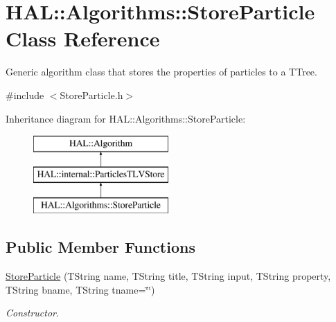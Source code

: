 \hypertarget{class_h_a_l_1_1_algorithms_1_1_store_particle}{\section{H\+A\+L\+:\+:Algorithms\+:\+:Store\+Particle Class Reference}
\label{class_h_a_l_1_1_algorithms_1_1_store_particle}
}


Generic algorithm class that stores the properties of particles to a T\+Tree.  




{\ttfamily \#include $<$Store\+Particle.\+h$>$}

Inheritance diagram for H\+A\+L\+:\+:Algorithms\+:\+:Store\+Particle\+:\begin{figure}[H]
\begin{center}
\leavevmode
\includegraphics[height=3.000000cm]{class_h_a_l_1_1_algorithms_1_1_store_particle}
\end{center}
\end{figure}
\subsection*{Public Member Functions}
\begin{DoxyCompactItemize}
\item 
\hyperlink{class_h_a_l_1_1_algorithms_1_1_store_particle_a160a46b43875d8968e865fc2335380f3}{Store\+Particle} (T\+String name, T\+String title, T\+String input, T\+String property, T\+String bname, T\+String tname=\char`\"{}\char`\"{})
\begin{DoxyCompactList}\small\item\em Constructor. \end{DoxyCompactList}\end{DoxyCompactItemize}
